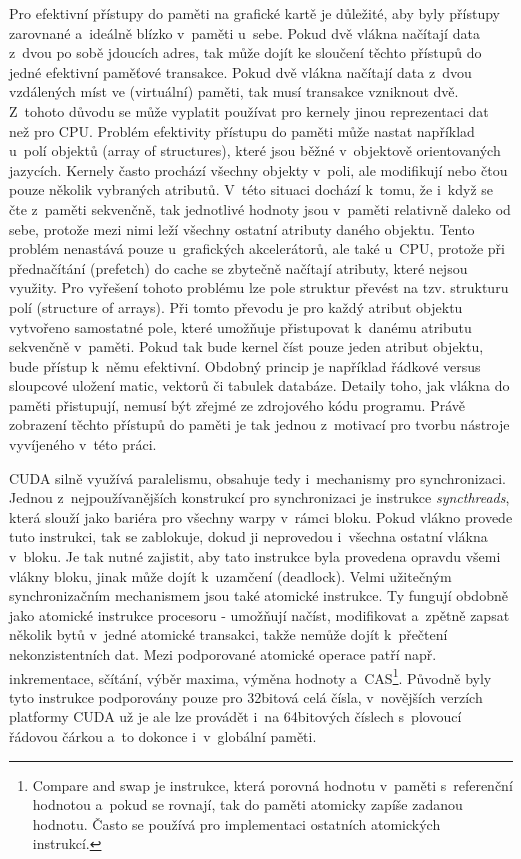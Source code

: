Pro efektivní přístupy do paměti na grafické kartě je důležité, aby byly přístupy zarovnané a~ideálně blízko v~paměti u~sebe. Pokud dvě vlákna načítají data z~dvou po sobě jdoucích adres, tak může dojít ke sloučení těchto přístupů do jedné efektivní paměťové transakce. Pokud dvě vlákna načítají data z~dvou vzdálených míst ve (virtuální) paměti, tak musí transakce vzniknout dvě. Z~tohoto důvodu se může vyplatit používat pro kernely jinou reprezentaci dat než pro CPU. Problém efektivity přístupu do paměti může nastat například u~polí objektů (\mbox{array} of structures), které jsou běžné v~objektově orientovaných jazycích. Kernely často prochází všechny objekty v~poli, ale modifikují nebo čtou pouze několik vybraných atributů. V~této situaci dochází k~tomu, že i~když se čte z~paměti sekvenčně, tak jednotlivé hodnoty jsou v~paměti relativně daleko od sebe, protože mezi nimi leží všechny ostatní atributy daného objektu. Tento problém nenastává pouze u~grafických akcelerátorů, ale také u~CPU, protože při přednačítání (prefetch) do cache se zbytečně načítají atributy, které nejsou využity. Pro vyřešení tohoto problému lze pole struktur převést na tzv. strukturu polí (structure of arrays). Při tomto převodu je pro každý atribut objektu vytvořeno samostatné pole, které umožňuje přistupovat k~danému atributu sekvenčně v~paměti. Pokud tak bude kernel číst pouze jeden atribut objektu, bude přístup k~němu efektivní. Obdobný princip je například řádkové versus sloupcové uložení matic, vektorů či tabulek databáze. Detaily toho, jak vlákna do paměti přistupují, nemusí být zřejmé ze zdrojového kódu programu. Právě zobrazení těchto přístupů do paměti je tak jednou z~motivací pro tvorbu nástroje vyvíjeného v~této práci.

CUDA silně využívá paralelismu, obsahuje tedy i~mechanismy pro synchronizaci. Jednou z~nej\-používanějších konstrukcí pro synchronizaci je instrukce \emph{syncthreads}, která slouží jako \mbox{bariéra} pro všechny warpy v~rámci bloku. Pokud vlákno provede tuto instrukci, tak se zablokuje, dokud ji neprovedou i~všechna ostatní vlákna v~bloku. Je tak nutné zajistit, aby tato instrukce byla provedena opravdu všemi vlákny bloku, jinak může dojít k~uzamčení (deadlock). Velmi užitečným synchronizačním mechanismem jsou také atomické instrukce. Ty fungují obdobně jako atomické instrukce procesoru - umožňují načíst, modifikovat a~zpětně zapsat několik bytů v~jedné atomické transakci, takže nemůže dojít k~přečtení nekonzistentních dat. Mezi podporované atomické operace patří např. inkrementace, sčítání, výběr maxima, výměna hodnoty a~CAS\footnote{Compare and swap je instrukce, která porovná hodnotu v~paměti s~referenční hodnotou a~pokud se rovnají, tak do paměti atomicky zapíše zadanou hodnotu. Často se používá pro implementaci ostatních atomických instrukcí.}. Původně byly tyto instrukce podporovány pouze pro 32bitová celá čísla, v~novějších verzích platformy CUDA už je ale lze provádět i~na 64bitových číslech s~plovoucí řádovou čárkou a~to dokonce i~v~globální paměti.

